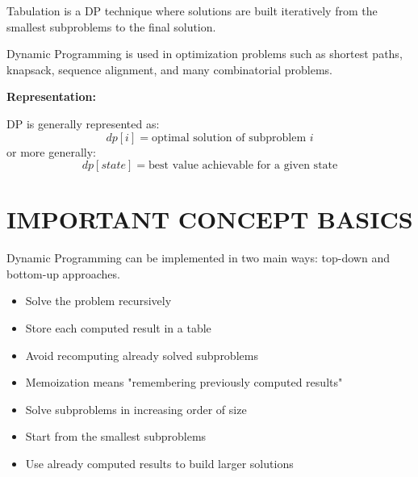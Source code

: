 \documentclass[11pt,a4paper,openany]{book}
\begin{document}
\begin{defnbox}[title=Tabulation (Bottom-up)]
Tabulation is a DP technique where solutions are built iteratively from the smallest subproblems to the final solution.
\end{defnbox}

\begin{defnbox}[title=Applications]
Dynamic Programming is used in optimization problems such as shortest paths, knapsack, sequence alignment, and many combinatorial problems.
\end{defnbox}

\textbf{Representation:}

DP is generally represented as:
\[
dp[i] = \text{optimal solution of subproblem } i
\]
or more generally:
\[
dp[state] = \text{best value achievable for a given state}
\]





\vspace{2cm}



\section{IMPORTANT CONCEPT BASICS}

\begin{defnbox}[title=Two ways of Dynamic Programming]
Dynamic Programming can be implemented in two main ways: top-down and bottom-up approaches.
\end{defnbox}

\begin{defnbox}[title=Top-down (Memoization)]
\begin{itemize}
    \item Solve the problem recursively
    \item Store each computed result in a table
    \item Avoid recomputing already solved subproblems
    \item Memoization means "remembering previously computed results"
\end{itemize}
\end{defnbox}

\begin{defnbox}[title=Bottom-up (Tabulation)]
\begin{itemize}
    \item Solve subproblems in increasing order of size
    \item Start from the smallest subproblems
    \item Use already computed results to build larger solutions
\end{itemize}
\end{defnbox}
\end{document}
